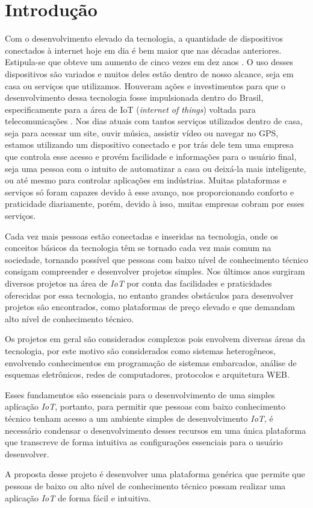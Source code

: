 \documentclass[../../layout.tex]{subfiles}
\begin{document}
\chapter{Introdução}
\hspace*{3em}Com o desenvolvimento elevado da tecnologia, a quantidade de dispositivos conectados à internet hoje em dia é bem maior que nas décadas anteriores. Estipula-se que obteve um aumento de cinco vezes em dez anos \cite{conectdevicesnum}. O uso desses dispositivos são variados e muitos deles estão dentro de nosso alcance, seja em casa ou serviços que utilizamos. Houveram ações e investimentos para que o desenvolvimento dessa tecnologia fosse impulsionada dentro do Brasil, especificamente para a área de IoT (\emph{internet of things}) voltada para telecomunicações \cite{iotinvest}. Nos dias atuais com tantos serviços utilizados dentro de casa, seja para acessar um site, ouvir música, assistir vídeo ou navegar no GPS, estamos utilizando um dispositivo conectado e por trás dele tem uma empresa que controla esse acesso e provém facilidade e informações para o usuário final, seja uma pessoa com o intuito de automatizar a casa ou deixá-la mais inteligente, ou até mesmo para controlar aplicações em indústrias. Muitas plataformas e serviços só foram capazes devido à esse avanço, nos proporcionando conforto e praticidade diariamente, porém, devido à isso, muitas empresas cobram por esses serviços.\par
Cada vez mais pessoas estão conectadas e inseridas na tecnologia, onde os conceitos básicos da tecnologia têm se tornado cada vez mais comum na sociedade, tornando possível  que pessoas com baixo nível de conhecimento técnico consigam compreender e desenvolver projetos simples. Nos últimos anos surgiram diversos projetos na área de \emph{IoT} por conta das facilidades e praticidades oferecidas por essa tecnologia, no entanto grandes obstáculos para desenvolver projetos são encontrados, como plataformas de preço elevado e que demandam alto nível de conhecimento técnico.\par
Os projetos em geral são considerados complexos pois envolvem diversas áreas da tecnologia, por este motivo são considerados como sistemas heterogêneos, envolvendo conhecimentos em programação de sistemas embarcados, análise de esquemas eletrônicos, redes de computadores, protocolos e arquitetura WEB.\par
Esses fundamentos são essenciais para o desenvolvimento de uma simples aplicação \emph{IoT}, portanto, para permitir que pessoas com baixo conhecimento técnico tenham acesso a um ambiente simples de desenvolvimento \emph{IoT}, é necessário condensar o desenvolvimento desses recursos em uma única plataforma que transcreve de forma intuitiva as configurações essenciais para o usuário desenvolver.\cite{IoTeveryone} \par
A proposta desse projeto é desenvolver uma plataforma genérica que permite que pessoas de baixo ou alto nível de conhecimento técnico possam realizar uma aplicação \emph{IoT} de forma fácil e intuitiva.
\end{document}
